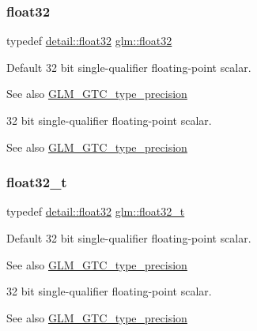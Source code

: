 \subsubsection{\texorpdfstring{float32}{float32}}
{\footnotesize\ttfamily typedef \hyperlink{namespaceglm_1_1detail_ad60558c5c304624de0b54c51b5857737}{detail\+::float32} \hyperlink{group__gtc__type__precision_ga814f2f65354b6588b067cc5c67a6b340}{glm\+::float32}}

Default 32 bit single-\/qualifier floating-\/point scalar. \begin{DoxySeeAlso}{See also}
\hyperlink{group__gtc__type__precision}{G\+L\+M\+\_\+\+G\+T\+C\+\_\+type\+\_\+precision}
\end{DoxySeeAlso}
32 bit single-\/qualifier floating-\/point scalar. \begin{DoxySeeAlso}{See also}
\hyperlink{group__gtc__type__precision}{G\+L\+M\+\_\+\+G\+T\+C\+\_\+type\+\_\+precision} 
\end{DoxySeeAlso}
\mbox{\label{group__gtc__type__precision_ga642737ae3e7c434b366f2191e6944bf2}} 
\subsubsection{\texorpdfstring{float32\+\_\+t}{float32\_t}}
{\footnotesize\ttfamily typedef \hyperlink{namespaceglm_1_1detail_ad60558c5c304624de0b54c51b5857737}{detail\+::float32} \hyperlink{group__gtc__type__precision_ga642737ae3e7c434b366f2191e6944bf2}{glm\+::float32\+\_\+t}}

Default 32 bit single-\/qualifier floating-\/point scalar. \begin{DoxySeeAlso}{See also}
\hyperlink{group__gtc__type__precision}{G\+L\+M\+\_\+\+G\+T\+C\+\_\+type\+\_\+precision}
\end{DoxySeeAlso}
32 bit single-\/qualifier floating-\/point scalar. \begin{DoxySeeAlso}{See also}
\hyperlink{group__gtc__type__precision}{G\+L\+M\+\_\+\+G\+T\+C\+\_\+type\+\_\+precision} 
\end{DoxySeeAlso}
\mbox{\label{group__gtc__type__precision_gab721f828b41f46b20cf4883b50733d3b}} 
